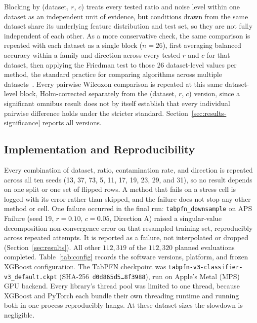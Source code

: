 Blocking by (dataset, $r$, $c$) treats every tested ratio and noise level
within one dataset as an independent unit of evidence, but conditions
drawn from the same dataset share its underlying feature distribution and
test set, so they are not fully independent of each other. As a more
conservative check, the same comparison is repeated with each dataset as
a single block ($n{=}26$), first averaging balanced accuracy within a
family and direction across every tested $r$ and $c$ for that dataset,
then applying the Friedman test to those 26 dataset-level values per
method, the standard practice for comparing algorithms across multiple
datasets~\cite{demsar2006statistical}. Every pairwise Wilcoxon comparison
is repeated at this same dataset-level block, Holm-corrected separately
from the (dataset, $r$, $c$) version, since a significant omnibus result
does not by itself establish that every individual pairwise difference
holds under the stricter standard. Section~\ref{sec:results-significance}
reports all versions.

\subsection{Implementation and Reproducibility}
\label{sec:methods-implementation}

Every combination of dataset, ratio, contamination rate, and direction is repeated across all ten seeds (13, 37, 73, 5, 11, 17, 19, 23, 29, and 31), so no result depends on one split or one set of flipped rows. A method that fails on a stress cell is logged with its error rather than skipped, and the failure does not stop any other method or cell. One failure occurred in the final run: \texttt{tabpfn\_downsample} on APS Failure (seed 19, $r{=}0.10$, $c{=}0.05$, Direction A) raised a singular-value decomposition non-convergence error on that resampled training set, reproducibly across repeated attempts. It is reported as a failure, not interpolated or dropped (Section~\ref{sec:results}). All other $112{,}319$ of the $112{,}320$ planned evaluations completed. Table~\ref{tab:config} records the software versions, platform, and frozen XGBoost configuration. The TabPFN checkpoint was \texttt{tabpfn-v3-classifier-v3\_default.ckpt} (SHA-256~\texttt{d0d865d5\ldots8f3988}), run on Apple's Metal (MPS) GPU backend. Every library's thread pool was limited to one thread, because XGBoost and PyTorch each bundle their own threading runtime and running both in one process reproducibly hangs. At these dataset sizes the slowdown is negligible.

